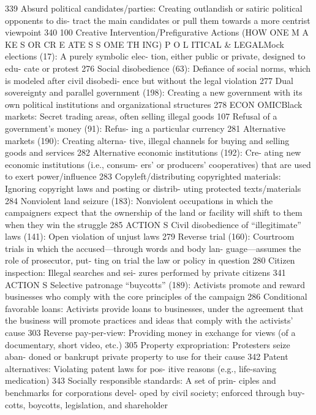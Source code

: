 \documentclass[twoside,a4paper,12pt,fleqn,openany]{extbook}
\begin{document}
 339
Absurd political candidates/parties: Creating
outlandish or satiric political opponents to dis-
tract the main candidates or pull them towards
a more centrist viewpoint
 340
100
Creative Intervention/Prefigurative Actions
(HOW ONE M A KE S OR CR E ATE S S OME TH ING)
P O L ITICAL & LEGALMock elections (17): A purely symbolic elec-
tion, either public or private, designed to edu-
cate or protest
 276
Social disobedience (63): Defiance of social
norms, which is modeled after civil disobedi-
ence but without the legal violation
 277
Dual sovereignty and parallel government
(198): Creating a new government with its
own political institutions and organizational
structures
 278
ECON OMICBlack markets: Secret trading areas, often
selling illegal goods
 107
Refusal of a government’s money (91): Refus-
ing a particular currency
 281
Alternative markets (190): Creating alterna-
tive, illegal channels for buying and selling
goods and services
 282
Alternative economic institutions (192): Cre-
ating new economic institutions (i.e., consum-
ers’ or producers’ cooperatives) that are used
to exert power/influence
 283
Copyleft/distributing copyrighted materials:
Ignoring copyright laws and posting or distrib-
uting protected texts/materials
 284
Nonviolent land seizure (183): Nonviolent
occupations in which the campaigners expect
that the ownership of the land or facility will
shift to them when they win the struggle 285
ACTION S
Civil disobedience of “illegitimate” laws (141):
Open violation of unjust laws
 279
Reverse trial (160): Courtroom trials in which
the accused—through words and body lan-
guage—assumes the role of prosecutor, put-
ting on trial the law or policy in question 280
Citizen inspection: Illegal searches and sei-
zures performed by private citizens
 341
ACTION S
Selective patronage “buycotts” (189): Activists
promote and reward businesses who comply
with the core principles of the campaign 286
Conditional favorable loans: Activists provide
loans to businesses, under the agreement that
the business will promote practices and ideas
that comply with the activists’ cause
 303
Reverse pay-per-view: Providing money in
exchange for views (of a documentary, short
video, etc.)
 305
Property expropriation: Protesters seize aban-
doned or bankrupt private property to use for
their cause
 342
Patent alternatives: Violating patent laws for pos-
itive reasons (e.g., life-saving medication) 343
Socially responsible standards: A set of prin-
ciples and benchmarks for corporations devel-
oped by civil society; enforced through buy-
cotts, boycotts, legislation, and shareholder
\end{document}
